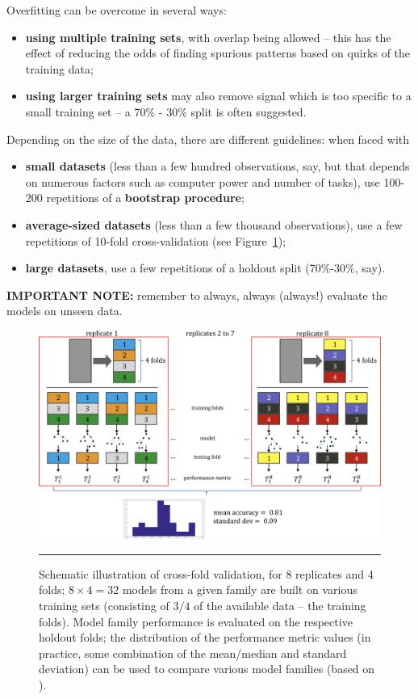 \afterpage{\FloatBarrier}
Overfitting can be overcome in several ways:
\begin{itemize}[noitemsep]
\item \textbf{using multiple training sets}, with overlap being allowed -- this has the effect of reducing the odds of finding spurious patterns based on quirks of the training data;  
\item \textbf{using larger training sets} may also remove signal which is too specific to a small training set -- a 70\% - 30\% split is  often suggested.
\end{itemize}
Depending on the size of the data, there are different guidelines: when faced with 
\begin{itemize}[noitemsep]
\item \textbf{small datasets} (less than a few hundred observations, say, but that depends on numerous factors such as computer power and number of tasks), use 100-200 repetitions of a \textbf{bootstrap procedure};
\item \textbf{average-sized datasets} (less than a few thousand observations), use a few repetitions of 10-fold cross-validation (see Figure~\ref{fig:cv1});
\item \textbf{large datasets}, use a few repetitions of a holdout split (70\%-30\%, say).
\end{itemize}
\textbf{IMPORTANT NOTE:} remember to always, always (always!) evaluate the models on unseen data.
\begin{figure}[!t]
\centering
\includegraphics[width=\textwidth]{images/DSML/8-4fcv.png} \caption[\small Illustration of cross-fold validation]{\small Schematic illustration of cross-fold validation, for 8 replicates and 4 folds; $8\times 4=32$ models from a given family are built on various training sets (consisting of $3/4$ of the available data -- the training folds). Model family performance is evaluated on the respective holdout folds; the distribution of the performance metric values (in practice, some combination of the mean/median and standard deviation) can be used to compare various model families  (based on \cite{DSML_PF,DSML_T}).}\hrule\label{fig:cv1}
\end{figure}
\afterpage{\FloatBarrier}
